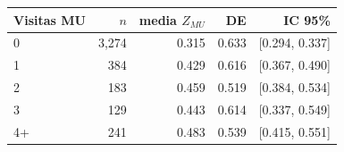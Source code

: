 \begin{tabular}{lrrrr}
\toprule
Visitas MU & $n$ & media $Z_{MU}$ & DE & IC 95\% \\
\midrule
0 & 3,274 & 0.315 & 0.633 & [0.294, 0.337] \\
1 & 384 & 0.429 & 0.616 & [0.367, 0.490] \\
2 & 183 & 0.459 & 0.519 & [0.384, 0.534] \\
3 & 129 & 0.443 & 0.614 & [0.337, 0.549] \\
4+ & 241 & 0.483 & 0.539 & [0.415, 0.551] \\
\bottomrule
\end{tabular}
